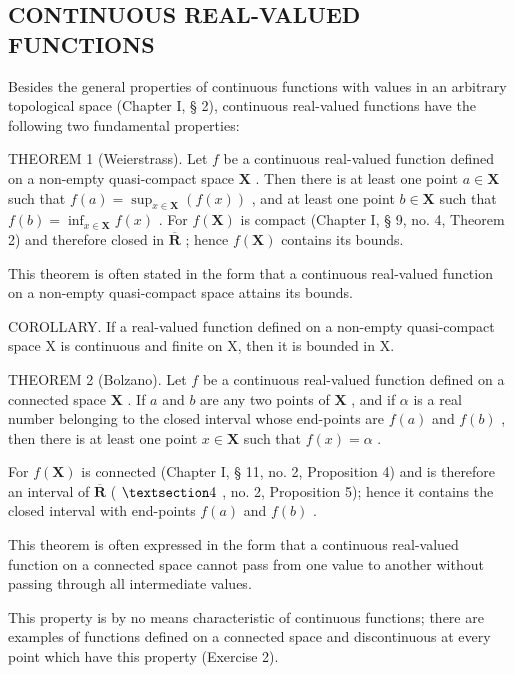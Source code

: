 \subsection{CONTINUOUS REAL-VALUED FUNCTIONS}

Besides the general properties of continuous functions with values in an arbitrary topological space (Chapter I, § 2), continuous real-valued functions have the following two fundamental properties:

THEOREM 1 (Weierstrass). Let \(f\) be a continuous real-valued function defined on a non-empty quasi-compact space \(\mathbf{X}\) . Then there is at least one point \(a \in \mathbf{X}\) such that \(f(a) = \sup_{x \in \mathbf{X}} (f(x))\) , and at least one point \(b \in \mathbf{X}\) such that \(f(b) = \inf_{x \in \mathbf{X}} f(x)\) . For \(f(\mathbf{X})\) is compact (Chapter I, § 9, no. 4, Theorem 2) and therefore closed in \(\overline{\mathbf{R}}\) ; hence \(f(\mathbf{X})\) contains its bounds.

This theorem is often stated in the form that a continuous real-valued function on a non-empty quasi-compact space attains its bounds.

COROLLARY. If a real-valued function defined on a non-empty quasi-compact space X is continuous and finite on X, then it is bounded in X.

THEOREM 2 (Bolzano). Let \(f\) be a continuous real-valued function defined on a connected space \(\mathbf{X}\) . If \(a\) and \(b\) are any two points of \(\mathbf{X}\) , and if \(\alpha\) is a real number belonging to the closed interval whose end-points are \(f(a)\) and \(f(b)\) , then there is at least one point \(x \in \mathbf{X}\) such that \(f(x) = \alpha\) .

For \(f(\mathbf{X})\) is connected (Chapter I, § 11, no. 2, Proposition 4) and is therefore an interval of \(\overline{\mathbf{R}}\) ( \(\S 4\) , no. 2, Proposition 5); hence it contains the closed interval with end-points \(f(a)\) and \(f(b)\) .

This theorem is often expressed in the form that a continuous real-valued function on a connected space cannot pass from one value to another without passing through all intermediate values.

This property is by no means characteristic of continuous functions; there are examples of functions defined on a connected space and discontinuous at every point which have this property (Exercise 2).

